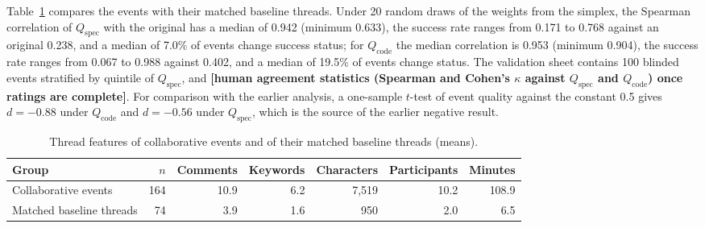 \documentclass{article}
\newcommand{\tbd}[1]{\textbf{[#1]}}
\begin{document}
Table~\ref{tab:thread_features} compares the events with their matched baseline threads. Under 20 random draws of the weights from the simplex, the Spearman correlation of $Q_{\text{spec}}$ with the original has a median of 0.942 (minimum 0.633), the success rate ranges from 0.171 to 0.768 against an original 0.238, and a median of 7.0\% of events change success status; for $Q_{\text{code}}$ the median correlation is 0.953 (minimum 0.904), the success rate ranges from 0.067 to 0.988 against 0.402, and a median of 19.5\% of events change status. The validation sheet contains 100 blinded events stratified by quintile of $Q_{\text{spec}}$, and \tbd{human agreement statistics (Spearman and Cohen's $\kappa$ against $Q_{\text{spec}}$ and $Q_{\text{code}}$) once ratings are complete}. For comparison with the earlier analysis, a one-sample $t$-test of event quality against the constant 0.5 gives $d = -0.88$ under $Q_{\text{code}}$ and $d = -0.56$ under $Q_{\text{spec}}$, which is the source of the earlier negative result.

\begin{table}[H]
\centering
\caption{Thread features of collaborative events and of their matched baseline threads (means).}
\label{tab:thread_features}
\begin{tabular}{@{}lrrrrrr@{}}
\toprule
\textbf{Group} & \textbf{$n$} & \textbf{Comments} & \textbf{Keywords} & \textbf{Characters} & \textbf{Participants} & \textbf{Minutes} \\
\midrule
Collaborative events & 164 & 10.9 & 6.2 & 7,519 & 10.2 & 108.9 \\
Matched baseline threads & 74 & 3.9 & 1.6 & 950 & 2.0 & 6.5 \\
\bottomrule
\end{tabular}
\end{table}
\end{document}
